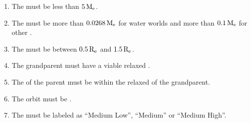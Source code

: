 \documentclass[letterpaper,10pt,english]{sphinxmanual}
\begin{document}
\begin{enumerate}
%
\item {} 
\sphinxAtStartPar
The {\hyperref[\detokenize{quantities/material/mass:id1}]{}} must be less than \(5 \, {\rm M_e}\).

\item {} 
\sphinxAtStartPar
The {\hyperref[\detokenize{quantities/material/mass:id1}]{}} must be more than \(0.0268 \, {\rm M_e}\) for water worlds and more than \(0.1 \, {\rm M_e}\) for other {\hyperref[\detokenize{quantities/material/composition_type:id1}]{}}.

\item {} 
\sphinxAtStartPar
The {\hyperref[\detokenize{quantities/geometric/radius:id1}]{}} must be between \(0.5 \, {\rm R_e}\) and \(1.5 \, {\rm R_e}\).

\item {} 
\sphinxAtStartPar
The {\hyperref[\detokenize{celestial_bodies/satellite:id1}]{}} grandparent must have a viable relaxed {\hyperref[\detokenize{quantities/habitability/habitable_zones/habitable_zones:id1}]{}}.

\item {} 
\sphinxAtStartPar
The {\hyperref[\detokenize{quantities/orbital/semi_major_axis:id1}]{}} of the {\hyperref[\detokenize{celestial_bodies/satellite:id1}]{}} parent must be within the relaxed {\hyperref[\detokenize{quantities/habitability/habitable_zones/habitable_zones:id1}]{}} of the {\hyperref[\detokenize{celestial_bodies/satellite:id1}]{}} grandparent.

\item {} 
\sphinxAtStartPar
The orbit must be {\hyperref[\detokenize{quantities/orbital/orbital_stability:id1}]{}}.

\item {} 
\sphinxAtStartPar
The {\hyperref[\detokenize{quantities/surface/internal_heating/tectonic_activity:id1}]{}} must be labeled as “Medium Low”, “Medium” or “Medium High”.

\end{enumerate}
\end{document}
